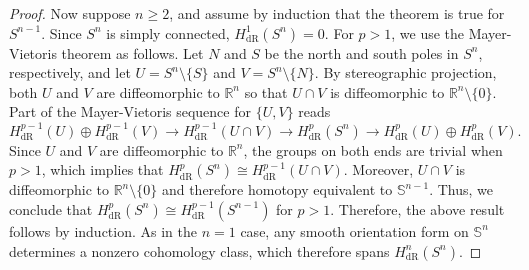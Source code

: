 \documentclass{article}
\begin{document}
\begin{itemize}
\begin{proof}
			Now suppose $n\geq 2$, and assume by induction that the theorem is true for $S^{n-1}$. Since $S^{n}$ is simply connected, $H^{1}_{\text{dR}}(S^{n}) = 0$. For $p > 1$, we use the Mayer-Vietoris theorem as follows. Let $N$ and $S$ be the north and south poles in $S^{n}$, respectively, and let $U = S^{n}\setminus \{S\}$ and $V = S^{n} \setminus \{N\}$. By stereographic projection, both $U$ and $V$ are diffeomorphic to $\mathbb{R}^{n}$ so that $U \cap V$ is diffeomorphic to $\mathbb{R}^{n} \setminus \{0\}$. Part of the Mayer-Vietoris sequence for $\{U, V\}$ reads 
			\begin{equation*}
				H^{p-1}_{\text{dR}}(U) \oplus H^{p-1}_{\text{dR}}(V) \to H^{p-1}_{\text{dR}}(U \cap V) \to H^{p}_{\text{dR}}(S^{n}) \to H^{p}_{\text{dR}}(U) \oplus H^{p}_{\text{dR}}(V). 
			\end{equation*}
			Since $U$ and $V$ are diffeomorphic to $\mathbb{R}^{n}$, the groups on both ends are trivial when $p > 1$, which implies that $H^{p}_{\text{dR}}(S^{n}) \cong H^{p-1}_{\text{dR}}(U \cap V)$. Moreover, $U \cap V$ is diffeomorphic to $\mathbb{R}^{n}\setminus \{0\}$ and therefore homotopy equivalent to $\mathbb{S}^{n-1}$. Thus, we conclude that $H^{p}_{\text{dR}}(S^{n}) \cong H^{p-1}_{\text{dR}}(S^{n-1})$ for $p > 1$. Therefore, the above result follows by induction. As in the $n = 1$ case, any smooth orientation form on $\mathbb{S}^{n}$ determines a nonzero cohomology class, which therefore spans $H^{n}_{\text{dR}}(S^{n})$. 
		\end{proof}
	\end{itemize}
	
\end{document}
